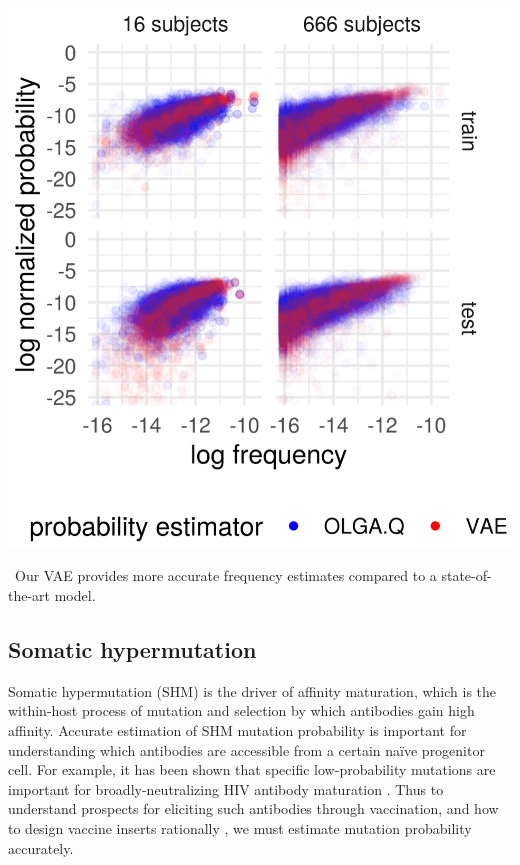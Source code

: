 \documentclass[nobib]{tufte-handout}
\begin{document}
\begin{marginfigure}[-0.8in]%
\begin{centering}
    \includegraphics[width=\textwidth]{log_normed_Ppost_vs_log_normed_Pvae.png}
\end{centering}
  \caption{\
    Our VAE provides more accurate frequency estimates compared to a state-of-the-art model.
    }
  \label{FIGfrequency}
\end{marginfigure}%

\subsection*{Somatic hypermutation}

Somatic hypermutation (SHM) is the driver of affinity maturation, which is the within-host process of mutation and selection by which antibodies gain high affinity.
Accurate estimation of SHM mutation probability is important for understanding which antibodies are accessible from a certain na\"ive progenitor cell.
For example, it has been shown that specific low-probability mutations are important for broadly-neutralizing HIV antibody maturation \cite{Bonsignori2017-nj,Hwang2017-tt,Wiehe2018-of}.
Thus to understand prospects for eliciting such antibodies through vaccination, and how to design vaccine inserts rationally \cite{Jardine2013-yt}, we must estimate mutation probability accurately.
\end{document}
